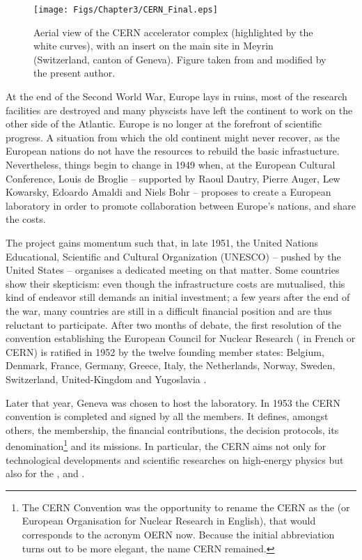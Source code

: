 \begin{figure}[t]
	\centering
	\texttt{[image: Figs/Chapter3/CERN\_Final.eps]}
	\caption{Aerial view of the CERN accelerator complex (highlighted by the white curves), with an insert on the main site in Meyrin (Switzerland, canton of Geneva). Figure taken from \cite{PuzzleGrandCollisionneur} and modified by the present author.}
	\label{fig:CERNView}
\end{figure}

At the end of the Second World War, Europe lays in ruins, most of the research facilities are destroyed and many physcists have left the continent to work on the other side of the Atlantic. Europe is no longer at the forefront of scientific progress. A situation from which the old continent might never recover, as the European nations do not have the resources to rebuild the basic infrastucture. Nevertheless, things begin to change in 1949 when, at the European Cultural Conference, Louis de Broglie -- supported by Raoul Dautry, Pierre Auger, Lew Kowarsky, Edoardo Amaldi and Niels Bohr -- proposes to create a European laboratory in order to promote collaboration between Europe's nations, and share the costs.

The project gains momentum such that, in late 1951, the United Nations Educational, Scientific and Cultural Organization (UNESCO) -- pushed by the United States -- organises a dedicated meeting on that matter. Some countries show their skepticism: even though the infrastructure costs are mutualised, this kind of endeavor still demands an initial investment; a few years after the end of the war, many countries are still in a difficult financial position and are thus reluctant to participate. After two months of debate, the first resolution of the convention establishing the European Council for Nuclear Research ( in French or CERN) is ratified in 1952 by the twelve founding member states: Belgium, Denmark, France, Germany, Greece, Italy, the Netherlands, Norway, Sweden, Switzerland, United-Kingdom and Yugoslavia \cite{deroseParis1951Birth2008}.

Later that year, Geneva was chosen to host the laboratory. In 1953 the CERN convention is completed and signed by all the members. It defines, amongst others, the membership, the financial contributions, the decision protocols, its denomination\footnote{The CERN Convention was the opportunity to rename the CERN as the  (or European Organisation for Nuclear Research in English), that would corresponds to the acronym OERN now. Because the initial abbreviation turns out to be more elegant, the name CERN remained.} and its missions. In particular, the CERN aims not only for technological developments and scientific researches on high-energy physics but also for the , and  \cite{cerncouncilConventionEstablishmentEuropean1953}.\\

